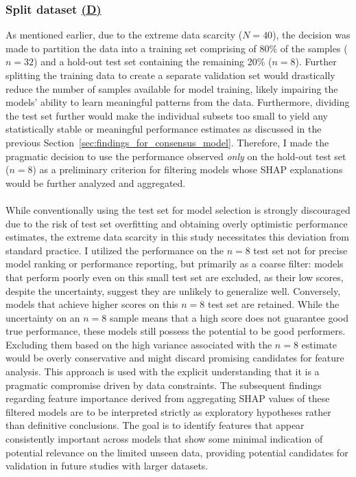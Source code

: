 \documentclass[12pt,a4paper]{report}
\begin{document}
\subsubsection*{Split dataset \hyperref[fig:pipeline-2]{(D)}}
As mentioned earlier, due to the extreme data scarcity ($N=40$), the decision was made to partition the data into a training set comprising of 80\% of the samples ($n=32$) and a hold-out test set containing the remaining 20\% ($n=8$). Further splitting the training data to create a separate validation set would drastically reduce the number of samples available for model training, likely impairing the models' ability to learn meaningful patterns from the data. Furthermore, dividing the test set further would make the individual subsets too small to yield any statistically stable or meaningful performance estimates as discussed in the previous Section~\ref{sec:findings_for_consensus_model}. Therefore, I made the pragmatic decision to use the performance observed \textit{only} on the hold-out test set ($n=8$) as a preliminary criterion for filtering models whose SHAP explanations would be further analyzed and aggregated.\\
\\
While conventionally using the test set for model selection is strongly discouraged due to the risk of test set overfitting and obtaining overly optimistic performance estimates, the extreme data scarcity in this study necessitates this deviation from standard practice. I utilized the performance on the $n=8$ test set not for precise model ranking or performance reporting, but primarily as a coarse filter: models that perform poorly even on this small test set are excluded, as their low scores, despite the uncertainty, suggest they are unlikely to generalize well. Conversely, models that achieve higher scores on this $n=8$ test set are retained. While the uncertainty on an $n=8$ sample means that a high score does not guarantee good true performance, these models still possess the potential to be good performers. Excluding them based on the high variance associated with the $n=8$ estimate would be overly conservative and might discard promising candidates for feature analysis. This approach is used with the explicit understanding that it is a pragmatic compromise driven by data constraints. The subsequent findings regarding feature importance derived from aggregating SHAP values of these filtered models are to be interpreted strictly as exploratory hypotheses rather than definitive conclusions. The goal is to identify features that appear consistently important across models that show some minimal indication of potential relevance on the limited unseen data, providing potential candidates for validation in future studies with larger datasets.
\end{document}
